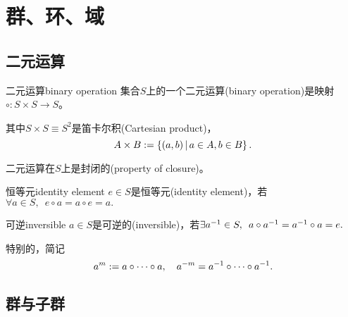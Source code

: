 \chapter{群、环、域}

\section{二元运算}

\begin{definition}{二元运算}{binary operation}
	集合$S$上的一个二元运算(binary operation)是映射$\circ:S\times S\to S$。

	其中$S\times S\equiv S^2$是笛卡尔积(Cartesian product)，
	\[
		A\times B:=\left\{(a,b)\,\middle\vert\,a\in A, b\in B\right\}.
	\]
\end{definition}
二元运算在$S$上是封闭的(property of closure)。
\begin{definition}{恒等元}{identity element}
	$e\in S$是恒等元(identity element)，若$\forall a\in S,\enspace e\circ a=a\circ e=a.$
\end{definition}
\begin{definition}{可逆}{inversible}
	$a\in S$是可逆的(inversible)，若$\exists a^{-1}\in S,\enspace a\circ a^{-1}=a^{-1}\circ a=e.$
\end{definition}
特别的，简记
\[
	a^m:=a\circ\cdots\circ a,\quad a^{-m}=a^{-1}\circ\cdots\circ a^{-1}.
\]

\section{群与子群}

